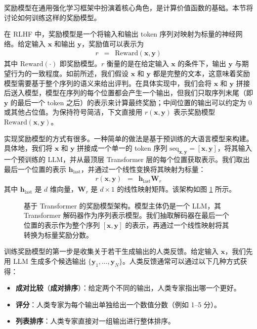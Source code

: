 \label{sec:training-reward-models}

\noindent 奖励模型在通用强化学习框架中扮演着核心角色，是计算价值函数的基础。本节将讨论如何训练这样的奖励模型。

在 RLHF 中，奖励模型是一个将输入和输出 token 序列对映射为标量的神经网络。给定输入 $\mathbf{x}$ 和输出 $\mathbf{y}$，奖励值可以表示为
\begin{eqnarray}
r & = & \mathrm{Reward}(\mathbf{x},\mathbf{y})
\end{eqnarray}
其中 $\mathrm{Reward}(\cdot)$ 即奖励模型。$r$ 衡量的是在给定输入 $\mathbf{x}$ 的条件下，输出 $\mathbf{y}$ 与期望行为的一致程度。如前所述，我们假设 $\mathbf{x}$ 和 $\mathbf{y}$ 都是完整的文本，这意味着奖励模型需要基于整个序列的语义来给出评判。在具体实现中，我们会将 $\mathbf{x}$ 和 $\mathbf{y}$ 拼接后送入模型，模型在序列的每个位置都会产生一个输出，但我们只取序列末尾（即 $\mathbf{y}$ 的最后一个 token 之后）的表示来计算最终奖励；中间位置的输出可以约定为 0 或其他占位值。为保持符号简洁，下文直接用 $r(\mathbf{x},\mathbf{y})$ 表示奖励模型 $\mathrm{Reward}(\mathbf{x},\mathbf{y})$。

实现奖励模型的方式有很多。一种简单的做法是基于预训练的大语言模型来构建。具体地，我们将 $\mathbf{x}$ 和 $\mathbf{y}$ 拼接成一个单一的 token 序列 $\mathrm{seq}_{\mathbf{x},\mathbf{y}} = [\mathbf{x}, \mathbf{y}]$，将其输入一个预训练的 LLM，并从最顶层 Transformer 层的每个位置获取表示。我们取出最后一个位置的表示 $\mathbf{h}_{\mathrm{last}}$，并通过一个线性变换将其映射为标量：
\begin{eqnarray}
r(\mathbf{x},\mathbf{y}) & = & \mathbf{h}_{\mathrm{last}} \mathbf{W}_{r}
\end{eqnarray}
其中 $\mathbf{h}_{\mathrm{last}}$ 是 $d$ 维向量，$\mathbf{W}_{r}$ 是 $d \times 1$ 的线性映射矩阵。该架构如图 \ref{fig:reward-model-architecture} 所示。

\begin{figure}[!t]
\centering

\caption{基于 Transformer 的奖励模型架构。模型主体仍是一个 LLM，其 Transformer 解码器作为序列表示模型。我们抽取解码器在最后一个位置的表示作为整个序列 $[\mathbf{x},\mathbf{y}]$ 的表示，再通过一个线性映射将其转换为标量奖励分数。}
\label{fig:reward-model-architecture}
\end{figure}

训练奖励模型的第一步是收集关于若干生成输出的人类反馈。给定输入 $\mathbf{x}$，我们先用 LLM 生成多个候选输出 $\{\mathbf{y}_1,\dots,\mathbf{y}_N\}$。人类反馈通常可以通过以下几种方式获得：
\begin{itemize}
\item \textbf{成对比较}（\textbf{成对排序}）：给定两个不同的输出，人类专家指出哪一个更好。
\item \textbf{评分}：人类专家为每个输出单独给出一个数值分数（例如 1--5 分）。
\item \textbf{列表排序}：人类专家直接对一组输出进行整体排序。
\end{itemize}

